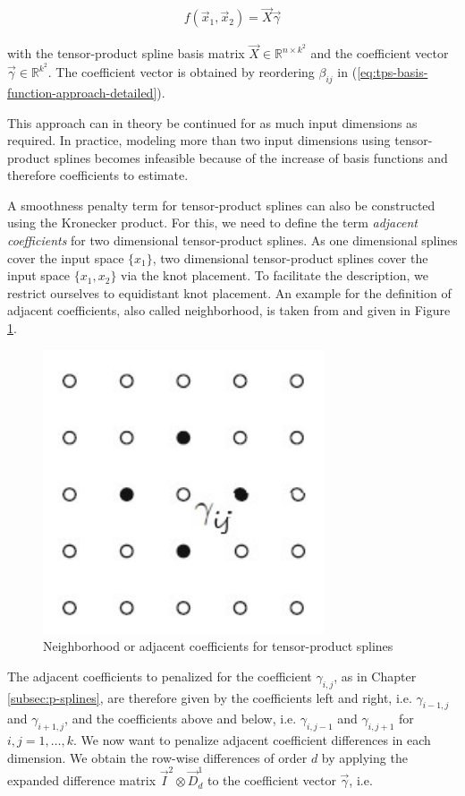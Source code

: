 \documentclass[10pt,a4paper]{report}
\begin{document}
\begin{align} \label{eq:tpspline-bf-approach}
	f(\vec{x}_1, \vec{x}_2) = \vec{X} \vec{\gamma}
\end{align}

with the tensor-product spline basis matrix $\vec{X} \in \mathbb{R}^{n \times k^2}$ and the coefficient vector $\vec{\gamma} \in \mathbb{R}^{k^2}$. The coefficient vector is obtained by reordering $\beta_{ij}$ in (\ref{eq:tps-basis-function-approach-detailed}).

This approach can in theory be continued for as much input dimensions as required. In practice, modeling more than two input dimensions using tensor-product splines becomes infeasible because of the increase of basis functions and therefore coefficients to estimate. 

A smoothness penalty term for tensor-product splines can also be constructed using the Kronecker product. For this, we need to define the term \emph{adjacent coefficients} for two dimensional tensor-product splines. As one dimensional splines cover the input space $\{x_1\}$, two dimensional tensor-product splines cover the input space $\{x_1, x_2\}$ via the knot placement. To facilitate the description, we restrict ourselves to equidistant knot placement. \cite{fahrmeir2013regression} An example for the definition of adjacent coefficients, also called neighborhood, is taken from \cite{fahrmeir2013regression} and given in Figure \ref{fig:tps-neighborhood}.

\begin{figure}[H]
	\centering
	\includegraphics[width=0.2\columnwidth]{../thesisplots/tps-neighborhood-2cropped.pdf}
	\caption{Neighborhood or adjacent coefficients for tensor-product splines}
	\label{fig:tps-neighborhood}
\end{figure}

The adjacent coefficients to penalized for the coefficient $\gamma_{i,j}$, as in Chapter \ref{subsec:p-splines}, are therefore given by the coefficients left and right, i.e. $\gamma_{i-1,j}$ and $\gamma_{i+1, j}$, and the coefficients above and below, i.e. $\gamma_{i,j-1}$ and $\gamma_{i,j+1}$ for $i,j=1, \dots, k$. We now want to penalize adjacent coefficient differences in each dimension. We obtain the row-wise differences of order $d$ by applying the expanded difference matrix $\vec{I}^2 \otimes \vec{D}_d^1$ to the coefficient vector $\vec{\gamma}$, i.e.
\end{document}
